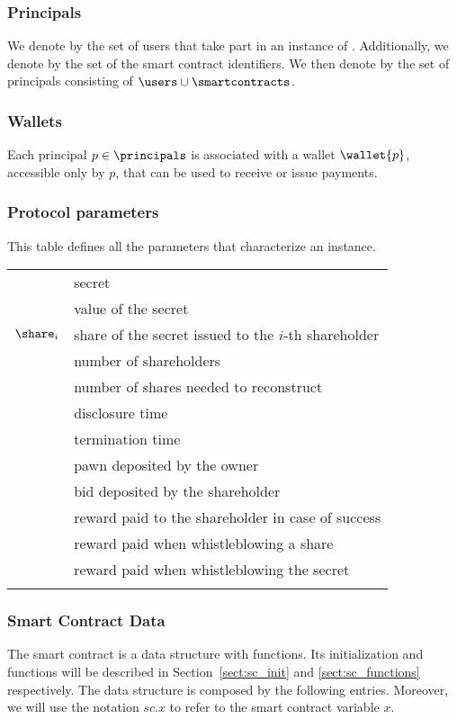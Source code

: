 \subsubsection*{Principals}
We denote by \users the set of users that take part in an instance of \shortname.
Additionally, we denote by \smartcontracts the set of the smart contract identifiers.
We then denote by \principals the set of principals consisting of $\users \cup \smartcontracts$.

\medskip

\subsubsection*{Wallets}
Each principal $p \in \principals$ is associated with a wallet $\wallet{p}$, accessible only by $p$, that can be used to receive or issue payments.

\medskip

\subsubsection*{Protocol parameters}
This table defines all the parameters that characterize an \shortname instance. \\

\begin{tabular}{ll}
	\secret & secret \\
	\V & value of the secret \\
	$\share_{i}$ & share of the secret issued to the $i$-th shareholder \\
	\N & number of shareholders \\
	\K & number of shares needed to reconstruct \secret \\	
	\td & disclosure time \\
	\te & termination time \\
	\PO & pawn deposited by the owner \\
	\BH & bid deposited by the shareholder \\
	\RH & reward paid to the shareholder in case of success \\
	\Wshare & reward paid when whistleblowing a share \\
	\Wsecret & reward paid when whistleblowing the secret \\

	& \\
\end{tabular}

\subsubsection*{Smart Contract Data}
The \shortname smart contract is a data structure with functions. 
Its initialization and functions will be described in Section~\ref{sect:sc_init} and \ref{sect:sc_functions} respectively. The data structure is composed by the following entries.
Moreover, we will use the notation $sc.x$ to refer to the smart contract variable $x$.

